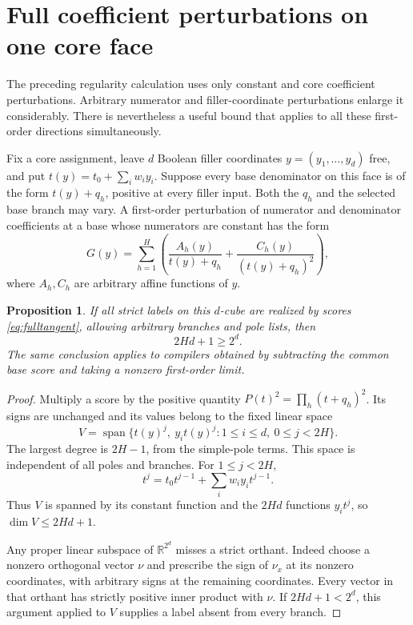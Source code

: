 \documentclass[11pt]{article}
\newtheorem{proposition}{Proposition}
\begin{document}
\section{Full coefficient perturbations on one core face}
The preceding regularity calculation uses only constant and core
coefficient perturbations. Arbitrary numerator and filler-coordinate
perturbations enlarge it considerably. There is nevertheless a useful
bound that applies to all these first-order directions simultaneously.

Fix a core assignment, leave $d$ Boolean filler coordinates
$y=(y_1,\ldots,y_d)$ free, and put
$t(y)=t_0+\sum_iw_iy_i$. Suppose every base denominator on this
face is of the form $t(y)+q_h$, positive at every filler input.
Both the $q_h$ and the selected base branch may vary. A first-order
perturbation of numerator and denominator coefficients at a base
whose numerators are constant has the form
\[
 G(y)=\sum_{h=1}^H
 \left(\frac{A_h(y)}{t(y)+q_h}
              +\frac{C_h(y)}{(t(y)+q_h)^2}\right),
 \tag{2}\label{eq:fulltangent}
\]
where $A_h,C_h$ are arbitrary affine functions of $y$.

\begin{proposition}
If all strict labels on this $d$-cube are realized by scores
\eqref{eq:fulltangent}, allowing arbitrary branches and pole lists,
then
\[
 2Hd+1\geq2^d.
\]
The same conclusion applies to compilers obtained by subtracting the
common base score and taking a nonzero first-order limit.
\end{proposition}
\begin{proof}
Multiply a score by the positive quantity
$P(t)^2=\prod_h(t+q_h)^2$. Its signs are unchanged and its values
belong to the fixed linear space
\[
 V=\operatorname{span}\{t(y)^j,\ y_it(y)^j:
          1\leq i\leq d,\ 0\leq j<2H\}.
\]
The largest degree is $2H-1$, from the simple-pole terms. This
space is independent of all poles and branches. For $1\leq j<2H$,
\[
 t^j=t_0t^{j-1}+\sum_iw_i y_it^{j-1}.
\]
Thus $V$ is spanned by its constant function and the $2Hd$ functions
$y_it^j$, so $\dim V\leq2Hd+1$.

Any proper linear subspace of $\mathbb R^{2^d}$ misses a strict
orthant. Indeed choose a nonzero orthogonal vector $\nu$ and prescribe
the sign of $\nu_x$ at its nonzero coordinates, with arbitrary signs
at the remaining coordinates. Every vector in that orthant has
strictly positive inner product with $\nu$. If $2Hd+1<2^d$, this
argument applied to $V$ supplies a label absent from every branch.
\end{proof}
\end{document}
